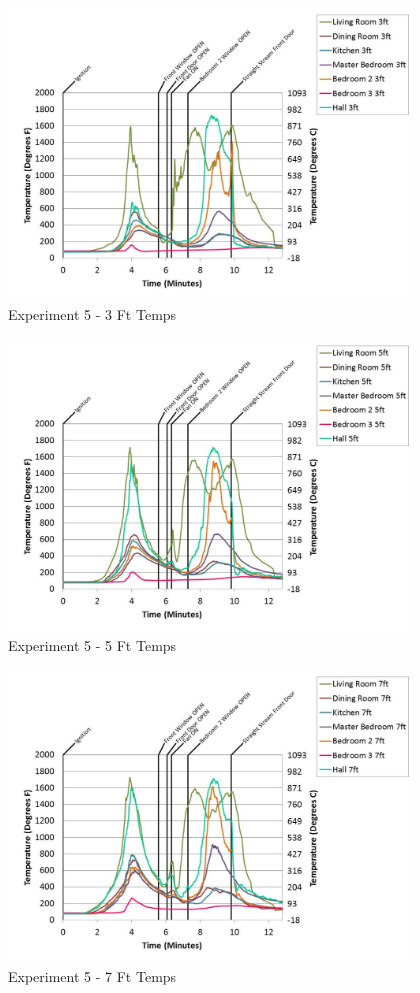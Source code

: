 \documentclass{article}
\begin{document}
\begin{appendices}
	\begin{figure}[h!]
		\centering
		\includegraphics[height=3.05in]{0_Images/Results_Charts/Exp_5_Charts/3FtTemps.pdf}
		\caption{Experiment 5 - 3 Ft Temps}
	\end{figure}
 
	\clearpage

	\begin{figure}[h!]
		\centering
		\includegraphics[height=3.05in]{0_Images/Results_Charts/Exp_5_Charts/5FtTemps.pdf}
		\caption{Experiment 5 - 5 Ft Temps}
	\end{figure}
 

	\begin{figure}[h!]
		\centering
		\includegraphics[height=3.05in]{0_Images/Results_Charts/Exp_5_Charts/7FtTemps.pdf}
		\caption{Experiment 5 - 7 Ft Temps}
	\end{figure}
 

\end{appendices}
\end{document}

